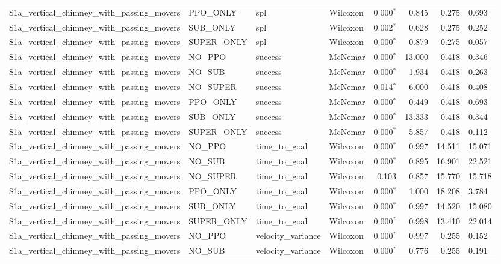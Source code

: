 \begin{tabular}{llllrrrl}
  S1a_vertical_chimney_with_passing_movers & PPO_ONLY & spl & Wilcoxon & 0.000$^{*}$ & 0.845 & 0.275 & 0.693 \\
  S1a_vertical_chimney_with_passing_movers & SUB_ONLY & spl & Wilcoxon & 0.002$^{*}$ & 0.628 & 0.275 & 0.252 \\
  S1a_vertical_chimney_with_passing_movers & SUPER_ONLY & spl & Wilcoxon & 0.000$^{*}$ & 0.879 & 0.275 & 0.057 \\
  S1a_vertical_chimney_with_passing_movers & NO_PPO & success & McNemar & 0.000$^{*}$ & 13.000 & 0.418 & 0.346 \\
  S1a_vertical_chimney_with_passing_movers & NO_SUB & success & McNemar & 0.000$^{*}$ & 1.934 & 0.418 & 0.263 \\
  S1a_vertical_chimney_with_passing_movers & NO_SUPER & success & McNemar & 0.014$^{*}$ & 6.000 & 0.418 & 0.408 \\
  S1a_vertical_chimney_with_passing_movers & PPO_ONLY & success & McNemar & 0.000$^{*}$ & 0.449 & 0.418 & 0.693 \\
  S1a_vertical_chimney_with_passing_movers & SUB_ONLY & success & McNemar & 0.000$^{*}$ & 13.333 & 0.418 & 0.344 \\
  S1a_vertical_chimney_with_passing_movers & SUPER_ONLY & success & McNemar & 0.000$^{*}$ & 5.857 & 0.418 & 0.112 \\
  S1a_vertical_chimney_with_passing_movers & NO_PPO & time_to_goal & Wilcoxon & 0.000$^{*}$ & 0.997 & 14.511 & 15.071 \\
  S1a_vertical_chimney_with_passing_movers & NO_SUB & time_to_goal & Wilcoxon & 0.000$^{*}$ & 0.895 & 16.901 & 22.521 \\
  S1a_vertical_chimney_with_passing_movers & NO_SUPER & time_to_goal & Wilcoxon & 0.103 & 0.857 & 15.770 & 15.718 \\
  S1a_vertical_chimney_with_passing_movers & PPO_ONLY & time_to_goal & Wilcoxon & 0.000$^{*}$ & 1.000 & 18.208 & 3.784 \\
  S1a_vertical_chimney_with_passing_movers & SUB_ONLY & time_to_goal & Wilcoxon & 0.000$^{*}$ & 0.997 & 14.520 & 15.080 \\
  S1a_vertical_chimney_with_passing_movers & SUPER_ONLY & time_to_goal & Wilcoxon & 0.000$^{*}$ & 0.998 & 13.410 & 22.014 \\
  S1a_vertical_chimney_with_passing_movers & NO_PPO & velocity_variance & Wilcoxon & 0.000$^{*}$ & 0.997 & 0.255 & 0.152 \\
  S1a_vertical_chimney_with_passing_movers & NO_SUB & velocity_variance & Wilcoxon & 0.000$^{*}$ & 0.776 & 0.255 & 0.191 \\

\end{tabular}
